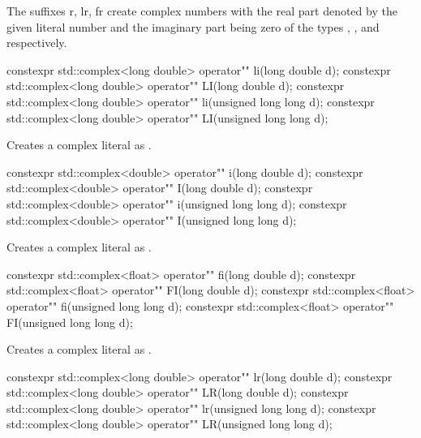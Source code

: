 \documentclass[ebook,11pt,article]{memoir}
\begin{document}
The suffixes r, lr, fr create complex numbers with the real part denoted by the given literal number and the imaginary part being zero of the types , , and  respectively. 

\begin{itemdecl}
constexpr std::complex<long double> operator"" li(long double d);
constexpr std::complex<long double> operator"" LI(long double d);
constexpr std::complex<long double> operator"" li(unsigned long long d);
constexpr std::complex<long double> operator"" LI(unsigned long long d);
\end{itemdecl}

\begin{itemdescr}
\pnum
\effects
Creates a complex literal as .
\end{itemdescr}

\begin{itemdecl}
constexpr std::complex<double> operator"" i(long double d);
constexpr std::complex<double> operator"" I(long double d);
constexpr std::complex<double> operator"" i(unsigned long long d);
constexpr std::complex<double> operator"" I(unsigned long long d);
\end{itemdecl}

\begin{itemdescr}
\pnum
\effects
Creates a complex literal as .
\end{itemdescr}

\begin{itemdecl}
constexpr std::complex<float> operator"" fi(long double d);
constexpr std::complex<float> operator"" FI(long double d);
constexpr std::complex<float> operator"" fi(unsigned long long d);
constexpr std::complex<float> operator"" FI(unsigned long long d);
\end{itemdecl}

\begin{itemdescr}
\pnum
\effects
Creates a complex literal as .
\end{itemdescr}

\begin{itemdecl}
constexpr std::complex<long double> operator"" lr(long double d);
constexpr std::complex<long double> operator"" LR(long double d);
constexpr std::complex<long double> operator"" lr(unsigned long long d);
constexpr std::complex<long double> operator"" LR(unsigned long long d);
\end{itemdecl}
\end{document}
